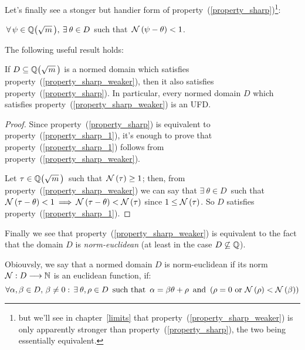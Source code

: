 \smallskip
Let's finally see a stonger but handier form of
property~(\ref{property_sharp})\footnote{%
but we'll see in chapter~\ref{limits} that
property~(\ref{property_sharp_weaker}) is only
apparently stronger than property~(\ref{property_sharp}),
the two being essentially equivalent.}:

\begin{property}\label{property_sharp_weaker}
$\,\forall\, \psi \in \QQ{m},\:
\exists\: \theta \in D$ such that\,
$\mathcal{N}\left(\psi - \theta\right) < 1$.
\end{property}

The following useful result holds:
\begin{thm}\label{property_sharp_weaker_implies_property_sharp}
If $D \subseteq \QQ{m}$ is a normed domain which satisfies
property~(\ref{property_sharp_weaker}), then it also satisfies
property~(\ref{property_sharp}).
In particular, every normed domain $D$ which satisfies
property~(\ref{property_sharp_weaker}) is an UFD.
\end{thm}

\begin{proof}
%
Since property~(\ref{property_sharp}) is equivalent to
property~(\ref{property_sharp_1}), it's enough to prove that
property~(\ref{property_sharp_1}) follows from
property~(\ref{property_sharp_weaker}).

Let $\tau \in \QQ{m}$\, such that\,
$\mathcal{N}\left(\tau\right) \geq 1$; then, from property~(\ref{property_sharp_weaker})
we can say that $\exists\: \theta \in D$\, such that\,
$\mathcal{N}\left(\tau - \theta\right) < 1 \:\Longrightarrow\: \mathcal{N}\left(\tau - \theta\right) <
\mathcal{N}\left(\tau\right)$ since $1 \leq \mathcal{N}\left(\tau\right)$.
So $D$ satisfies property~(\ref{property_sharp_1}).
%
\end{proof}

\medskip

Finally we see that property~(\ref{property_sharp_weaker})
is equivalent to the fact that the domain $D$ is
\emph{norm-euclidean} (at least in the case
$D \not\subseteq \mathbb{Q}$).

Obiouvsly, we say that a normed domain $D$ is norm-euclidean
if its norm\, $\mathcal{N}: D \longrightarrow \mathbb{N}$ is an
euclidean function, \ie if:
$$
\forall \alpha,\beta \in D,\,\beta \ne 0:\, \exists\:
\theta,\rho \in D\,\ \textrm{such that}\ \, 
\alpha = \beta \theta + \rho\,\ \textrm{and}\,\
(\rho = 0\ \textrm{or}\ \mathcal{N}\left(\rho\right) < \mathcal{N}\left(\beta\right))
$$


